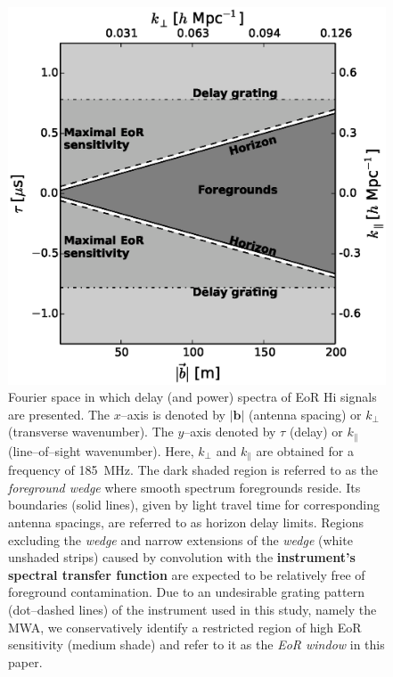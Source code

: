 \documentclass[preprint2,iop,numberedappendix]{emulateapj}
\begin{document}
\begin{figure}[htb]
\centering
\includegraphics[width=\linewidth]{f1.eps}
\caption{Fourier space in which delay (and power) spectra of EoR H{\sc i} signals are presented. The $x$--axis is denoted by $|\boldsymbol{b}|$ (antenna spacing) or $k_\perp$ (transverse wavenumber). The $y$--axis denoted by $\tau$ (delay) or $k_\parallel$ (line--of--sight wavenumber). Here, $k_\perp$ and $k_\parallel$ are obtained for a frequency of 185~MHz. The dark shaded region is referred to as the {\it foreground wedge} where smooth spectrum foregrounds reside. Its boundaries (solid lines), given by light travel time for corresponding antenna spacings, are referred to as horizon delay limits. Regions excluding the {\it wedge} and narrow extensions of the {\it wedge} (white unshaded strips) caused by convolution with the {\bf instrument's spectral transfer function} are expected to be relatively free of foreground contamination. Due to an undesirable grating pattern (dot--dashed lines) of the instrument used in this study, namely the MWA, we conservatively identify a restricted region of high EoR sensitivity (medium shade) and refer to it as the {\it EoR window} in this paper. \label{fig:fourier-space}}
\end{figure}
\end{document}

